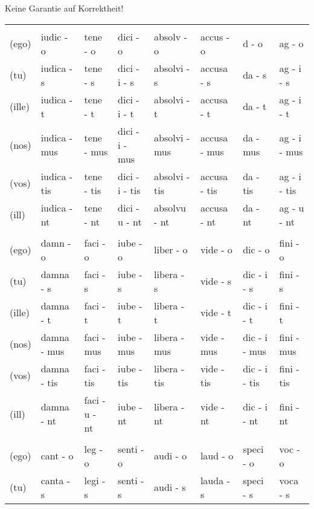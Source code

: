 \documentclass[a4paper, landscape]{article}
\begin{document}
\begin{landscape}
\begin{table}[]
	\begin{center}
		Keine Garantie auf Korrektheit! \\
	\end{center}
\begin{tabular}{llllllll}
	& & & &  &  &  & \\
	(ego)	& iudic - o		& tene - o		& dici - o			& absolv - o	 & accus  - o   & d -  o		& ag - o \\ 
	(tu)	& iudica - s	& tene - s		& dici - i - s		& absolvi - s    & accusa - s   & da - s		& ag - i - s \\
	(ille)	& iudica - t	& tene - t		& dici - i - t		& absolvi - t    & accusa - t   & da - t		& ag - i - t \\
	(nos)	& iudica - mus	& tene - mus	& dici - i - mus	& absolvi - mus & accusa - mus & da - mus		& ag - i - mus \\
	(vos)	& iudica - tis	& tene - tis	& dici - i - tis	& absolvi - tis  & accusa - tis & da - tis		& ag - i - tis \\
	(ill)	& iudica - nt	& tene - nt		& dici - u - nt		& absolvu - nt	 & accusa - nt  & da - nt		& ag - u - nt \\
	& & & &  &  &  & \\
	(ego)	& damn	- o		& faci - o		& iube - o 	 & liber  - o   & vide - o   & dic     - o	 & fini - o  \\ 
	(tu)	& damna - s		& faci - s		& iube - s	 & libera - s   & vide - s	 & dic - i - s	 & fini - s \\
	(ille)	& damna - t		& faci - t		& iube - t	 & libera - t   & vide - t	 & dic - i - t 	 & fini - t  \\
	(nos)	& damna - mus	& faci - mus	& iube - mus & libera - mus & vide - mus & dic - i - mus & fini - mus \\
	(vos)	& damna - tis	& faci - tis	& iube - tis & libera - tis & vide - tis & dic - i - tis & fini - tis \\
	(ill)	& damna - nt	& faci - u - nt	& iube - nt	 & libera - nt  & vide - nt  & dic - i - nt	 & fini - nt \\
	& & & &  &  &  & \\
	(ego)	& cant  - o		& leg -  o		& senti - o		& audi - o		& laud - o		& speci - o		 & voc - o \\
	(tu)	& canta - s		& legi - s		& senti - s		& audi - s		& lauda - s		& speci - s		 & voca - s \\

\end{tabular}
\end{table}
\end{landscape}
\end{document}
